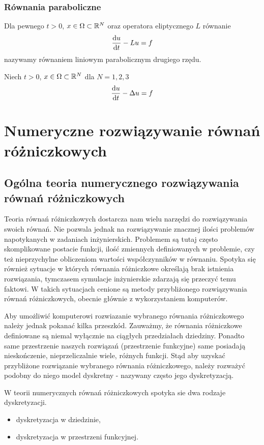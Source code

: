 \documentclass[12pt,a4paper]{report}
\begin{document}
\subsection{Równania paraboliczne}
Dla pewnego $t>0$, $x \in \Omega \subset \setR^N$ oraz operatora eliptycznego $L$ równanie
$$
\ddx[u]{t} -  Lu = f 
$$
nazywamy równaniem liniowym parabolicznym drugiego rzędu. 
\begin{example} 
Niech $t>0$, $x \in \Omega \subset \setR^N $ dla $ N = 1,2,3 $
$$
\ddx[u]{t} - \Delta u = f
$$
\chapter{Numeryczne rozwiązywanie równań różniczkowych}

\section{Ogólna teoria numerycznego rozwiązywania równań różniczkowych}

Teoria równań różniczkowych dostarcza nam wielu narzędzi do rozwiązywania swoich równań. Nie pozwala jednak na rozwiązywanie znacznej ilości problemów napotykanych w zadaniach inżynierskich. Problemem są tutaj często skomplikowane postacie funkcji, ilość zmiennych definiowanych w problemie, czy też nieprzychylne obliczeniom wartości współczynników w równaniu. Spotyka się również sytuacje w których równania różniczkowe określają brak istnienia rozwiązania, tymczasem symulacje inżynierskie zdarzają się przeczyć temu faktowi. W takich sytuacjach cenione są metody przybliżonego rozwiązywania równań różniczkowych, obecnie głównie z wykorzystaniem komputerów. 

Aby umożliwić komputerowi rozwiazanie wybranego równania różniczkowego należy jednak pokanać kilka przeszkód. Zauważmy, że równania różniczkowe definiowane są niemal wyłącznie na ciągłych przedziałach dziedziny. Ponadto same przestrzenie naszych rozwiązań (przestrzenie funkcyjne) same posiadają nieskończenie, nieprzeliczalnie wiele, różnych funkcji. Stąd aby uzyskać przybliżone rozwiązanie wybranego równania różniczkowego, należy rozważyć podobny do niego model dyskretny - nazywany często jego dyskretyzacją. 

W teorii numerycznych równań różniczkowych spotyka sie dwa rodzaje dyskretyzacji.
\begin{itemize}
\item dyskretyzacja w dziedzinie,
\item dyskretyzacja w przestrzeni funkcyjnej.
\end{itemize}


\end{example}
\end{document}
